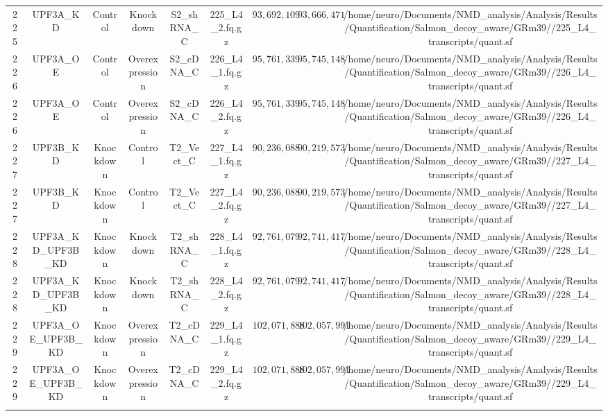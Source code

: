 \begin{table}[!htbp]
\begin{tabular}{@{\extracolsep{5pt}} ccccccccc}
225 & UPF3A\_KD & Control & Knockdown & S2\_shRNA\_C & 225\_L4\_2.fq.gz & $93,692,109$ & $93,666,471$ & /home/neuro/Documents/NMD\_analysis/Analysis/Results/Quantification/Salmon\_decoy\_aware/GRm39//225\_L4\_transcripts/quant.sf \\ 
226 & UPF3A\_OE & Control & Overexpression & S2\_cDNA\_C & 226\_L4\_1.fq.gz & $95,761,339$ & $95,745,148$ & /home/neuro/Documents/NMD\_analysis/Analysis/Results/Quantification/Salmon\_decoy\_aware/GRm39//226\_L4\_transcripts/quant.sf \\ 
226 & UPF3A\_OE & Control & Overexpression & S2\_cDNA\_C & 226\_L4\_2.fq.gz & $95,761,339$ & $95,745,148$ & /home/neuro/Documents/NMD\_analysis/Analysis/Results/Quantification/Salmon\_decoy\_aware/GRm39//226\_L4\_transcripts/quant.sf \\ 
227 & UPF3B\_KD & Knockdown & Control & T2\_Vect\_C & 227\_L4\_1.fq.gz & $90,236,088$ & $90,219,573$ & /home/neuro/Documents/NMD\_analysis/Analysis/Results/Quantification/Salmon\_decoy\_aware/GRm39//227\_L4\_transcripts/quant.sf \\ 
227 & UPF3B\_KD & Knockdown & Control & T2\_Vect\_C & 227\_L4\_2.fq.gz & $90,236,088$ & $90,219,573$ & /home/neuro/Documents/NMD\_analysis/Analysis/Results/Quantification/Salmon\_decoy\_aware/GRm39//227\_L4\_transcripts/quant.sf \\ 
228 & UPF3A\_KD\_UPF3B\_KD & Knockdown & Knockdown & T2\_shRNA\_C & 228\_L4\_1.fq.gz & $92,761,079$ & $92,741,417$ & /home/neuro/Documents/NMD\_analysis/Analysis/Results/Quantification/Salmon\_decoy\_aware/GRm39//228\_L4\_transcripts/quant.sf \\ 
228 & UPF3A\_KD\_UPF3B\_KD & Knockdown & Knockdown & T2\_shRNA\_C & 228\_L4\_2.fq.gz & $92,761,079$ & $92,741,417$ & /home/neuro/Documents/NMD\_analysis/Analysis/Results/Quantification/Salmon\_decoy\_aware/GRm39//228\_L4\_transcripts/quant.sf \\ 
229 & UPF3A\_OE\_UPF3B\_KD & Knockdown & Overexpression & T2\_cDNA\_C & 229\_L4\_1.fq.gz & $102,071,888$ & $102,057,991$ & /home/neuro/Documents/NMD\_analysis/Analysis/Results/Quantification/Salmon\_decoy\_aware/GRm39//229\_L4\_transcripts/quant.sf \\ 
229 & UPF3A\_OE\_UPF3B\_KD & Knockdown & Overexpression & T2\_cDNA\_C & 229\_L4\_2.fq.gz & $102,071,888$ & $102,057,991$ & /home/neuro/Documents/NMD\_analysis/Analysis/Results/Quantification/Salmon\_decoy\_aware/GRm39//229\_L4\_transcripts/quant.sf \\ 
\hline \\[-1.8ex] 
\end{tabular} 
\end{table} 
